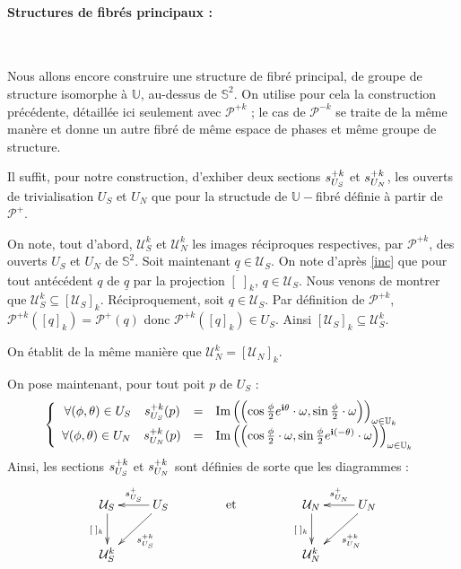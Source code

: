 \paragraph{Structures de fibr\'es principaux :}~\\
\par
Nous allons encore construire une structure de fibr\'e principal, de groupe de structure isomorphe \`a $\mathbb{U}$, au-dessus de $\mathbb{S}^2$. %
On utilise pour cela la construction pr\'ec\'edente, d\'etaill\'ee ici seulement avec $\mathcal{P}^{+k}$ ; le cas de $\mathcal{P}^{-k}$ se traite de la m\^eme man\`ere et donne un autre fibr\'e de m\^eme espace de phases et m\^eme groupe de structure.
\par
Il suffit, pour notre construction, d'exhiber deux sections $s_{U_{S}}^{+k}$ et $s_{U_{N}}^{+k}$, les ouverts de trivialisation $U_S$ et $U_N$ que pour la structude de $\mathbb{U}-$fibr\'e d\'efinie \`a partir de $\mathcal{P}^+$.
\par
On note, tout d'abord, $\mathcal{U}_S^k$ et $\mathcal{U}_N^k$ les images r\'eciproques respectives, par $\mathcal{P}^{+k}$, des ouverts $U_S$ et $U_N$ de $\mathbb {S}^2$. %
Soit maintenant $\underline{q}\in\mathcal{U}_S$. On note d'apr\`es \ref{inc} que pour tout ant\'ec\'edent $q$ de $\underline{q}$ par la projection $[\; ]_k$, %
$q\in\mathcal{U}_S$. Nous venons de montrer que $\mathcal{U}_S^k\subseteq [\mathcal{U}_S]_k$. R\'eciproquement, soit $q\in\mathcal{U}_S$. %
Par d\'efinition de $\mathcal{P}^{+k}$, $\mathcal{P}^{+k}([q]_k)=\mathcal{P}^+(q)$ donc $\mathcal{P}^{+k}([q]_k)\in U_S$. Ainsi $[\mathcal{U}_S]_k\subseteq\mathcal{U}_S^k$.
\par
On \'etablit de la m\^eme mani\`ere que $\mathcal{U}_N^k=[\mathcal{U}_N]_k$.
\par
On pose maintenant, pour tout poit $p$ de $U_S$ : 
\[%
\left\{\begin{array}{rccl}%
\forall (\phi,\theta )\in U_S&\se{S}{+k}(p)&=&\pl{\cos\frac{\phi}{2}\ec{\theta}}{\sin\frac{\phi}{2}}\\%
\forall (\phi,\theta )\in U_N&\se{N}{+k}(p)&=&\pl{\cos\frac{\phi}{2}}{\sin\frac{\phi}{2}\ec{(-\theta )}}%
\end{array}\right.%
\]
Ainsi, les sections $s_{U_{S}}^{+k}$ et $s_{U_{N}}^{+k}$ sont d\'efinies de sorte que les diagrammes :
\[%
\xymatrix{%
\mathcal{U}_S\ar[d]_{[\; ]_k}&U_S\ar[l]_{\se{S}{+}}\ar[ld]^{\se{S}{+k}}\\%
\mathcal{U}_S^k&%
}%
\text{\hspace{1.5cm}et\hspace{1.5cm}}%
\xymatrix{%
\mathcal{U}_N\ar[d]_{[\; ]_k}&U_N\ar[l]_{\se{N}{+}}\ar[ld]^{\se{N}{+k}}\\%
\mathcal{U}_N^k&%
}%
\]

